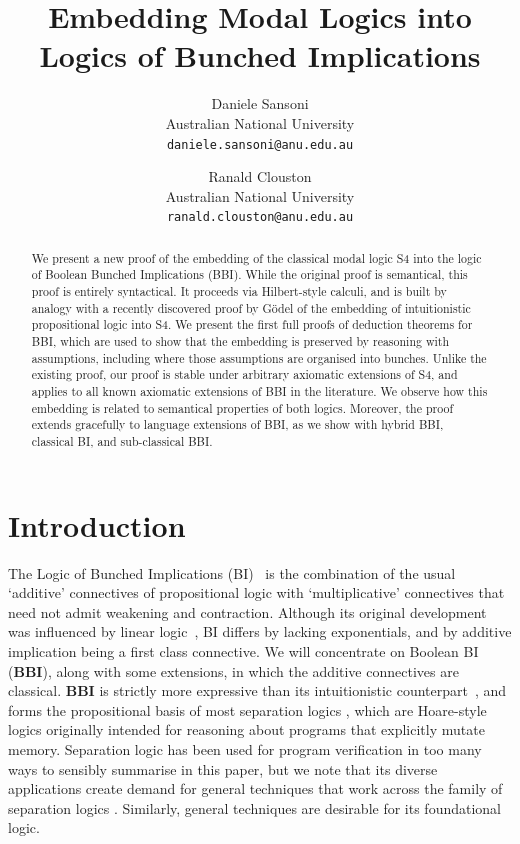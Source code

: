 \documentclass[a4paper]{article}
\title{Embedding Modal Logics into Logics of Bunched Implications
}
\author{%
  Daniele Sansoni\\Australian National University\\\texttt{daniele.sansoni@anu.edu.au}
  \and
  Ranald Clouston\\Australian National University\\\texttt{ranald.clouston@anu.edu.au}
}
\date{}
\newcommand{\BBI}{\textbf{BBI}\xspace}
\begin{document}
\maketitle

\begin{abstract}
We present a new proof of the embedding of the classical modal logic S4 into the logic of Boolean Bunched Implications (BBI).
While the original proof is semantical, this proof is entirely syntactical.
It proceeds via Hilbert-style calculi,
and is built by analogy with a recently discovered proof by G\"odel of the embedding of intuitionistic propositional logic into S4.
We present the first full proofs of deduction theorems for BBI,
which are used to show that the embedding is preserved by reasoning with assumptions, including where those assumptions are organised into bunches.
%
Unlike the existing proof, our proof is stable under arbitrary axiomatic extensions of S4, and applies to all known axiomatic extensions of BBI in the literature. We observe how this embedding is related to semantical properties of both logics. Moreover, the proof extends gracefully to language extensions of BBI, as we show with hybrid BBI, classical BI, and sub-classical BBI.
\end{abstract}

\section{Introduction}

The Logic of Bunched Implications (BI)~\cite{pym_semantics_2002} is the combination of the usual `additive' connectives of propositional logic with `multiplicative' connectives that need not admit weakening and contraction.
Although its original development~\cite{OHearn1999Logic} was influenced by linear logic~\cite{girard1987Linear}, BI differs by lacking exponentials, and by additive implication being a first class connective.
We will concentrate on Boolean BI (\BBI), along with some extensions, in which the additive connectives are classical.
\BBI is strictly more expressive than its intuitionistic counterpart~\cite{Ishtiaq2001BI}, and forms the propositional basis of most separation logics \cite{1029817}, which are Hoare-style logics originally intended for reasoning about programs that explicitly mutate memory.
Separation logic has been used for program verification in too many ways to sensibly summarise in this paper, but we note that its diverse applications create demand for general techniques that work across the family of separation logics \cite{Parkinson2010Next,Bringing_order}.
Similarly, general techniques are desirable for its foundational logic.
\end{document}
